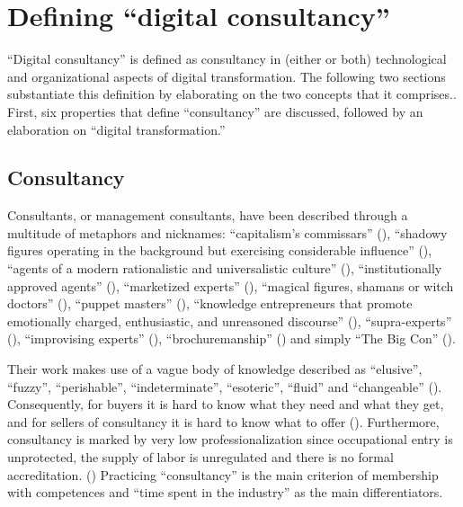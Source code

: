 \documentclass[
  man,floatsintext]{apa6}
\begin{document}
\newpage

\section{Defining ``digital consultancy''}\label{defining-digital-consultancy}

``Digital consultancy'' is defined as consultancy in (either or both) technological and organizational aspects of digital transformation. The following two sections substantiate this definition by elaborating on the two concepts that it comprises.. First, six properties that define ``consultancy'' are discussed, followed by an elaboration on ``digital transformation.''

\subsection{Consultancy}\label{consultancy}

Consultants, or management consultants, have been described through a multitude of metaphors and nicknames: ``capitalism's commissars'' (), ``shadowy figures operating in the background but exercising considerable influence'' (), ``agents of a modern rationalistic and universalistic culture'' (), ``institutionally approved agents'' (), ``marketized experts'' (), ``magical figures, shamans or witch doctors'' (), ``puppet masters'' (), ``knowledge entrepreneurs that promote emotionally charged, enthusiastic, and unreasoned discourse'' (), ``supra-experts'' (), ``improvising experts'' (), ``brochuremanship'' () and simply ``The Big Con'' ().

Their work makes use of a vague body of knowledge described as ``elusive'', ``fuzzy'', ``perishable'', ``indeterminate'', ``esoteric'', ``fluid'' and ``changeable'' (). Consequently, for buyers it is hard to know what they need and what they get, and for sellers of consultancy it is hard to know what to offer (). Furthermore, consultancy is marked by very low professionalization since occupational entry is unprotected, the supply of labor is unregulated and there is no formal accreditation. () Practicing ``consultancy'' is the main criterion of membership with competences and ``time spent in the industry'' as the main differentiators.
\end{document}
